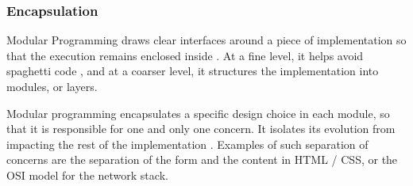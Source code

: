 

\subsubsection{Encapsulation} \label{chapter3:definitions:productivity:encapsulation}


Modular Programming draws clear interfaces around a piece of implementation so that the execution remains enclosed inside \cite{Dijkstra1970}.
At a fine level, it helps avoid spaghetti code \cite{Dijkstra1968a}, and at a coarser level, it structures the implementation \cite{Dijkstra1968} into modules, or layers.

Modular programming encapsulates a specific design choice in each module, so that it is responsible for one and only one concern.
It isolates its evolution from impacting the rest of the implementation \cite{Parnas1972, Tarr1999, Hursch1995}.
Examples of such separation of concerns are the separation of the form and the content in HTML / CSS, or the OSI model for the network stack.

